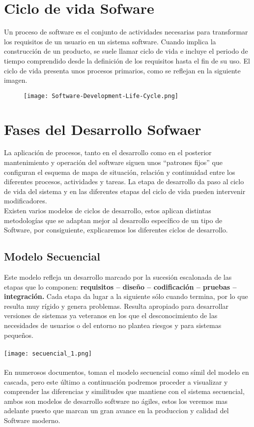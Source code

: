 \documentclass{article}
\begin{document}
\section{Ciclo de vida Sofware}
Un proceso de software es el conjunto de actividades necesarias para transformar los requisitos de un usuario en un sistema software. 
Cuando implica la construcción de un producto, se suele llamar ciclo de vida e incluye el periodo de tiempo comprendido desde la definición 
de los requisitos hasta el fin de su uso. El ciclo de vida presenta unos procesos primarios, como se reflejan en la siguiente imagen.
\\

\begin{figure}[b]
   
    \texttt{[image: Software-Development-Life-Cycle.png]}
    \centering
    
\end{figure}

\newpage
\section{Fases del Desarrollo Sofwaer}
La aplicación de procesos, tanto en el desarrollo como en el posterior mantenimiento y operación del software siguen unos “patrones fijos” 
que configuran el esquema de mapa de situación, relación y continuidad entre los diferentes procesos, actividades y tareas. La etapa de 
desarrollo da paso al ciclo de vida del sistema y en las diferentes etapas del ciclo de vida pueden intervenir modificadores.
\\
Existen varios modelos de ciclos de desarrollo, estos aplican distintas metodologías que se adaptan mejor al desarrollo específico de un tipo 
de Software, por consiguiente, explicaremos los diferentes ciclos de desarrollo.
\\
\subsection{Modelo Secuencial}
Este modelo refleja un desarrollo marcado por la sucesión escalonada de las etapas que lo componen: \textbf{requisitos – diseño – codificación – pruebas – integración.}
Cada etapa da lugar a la siguiente sólo cuando termina, por lo que resulta muy rígido y genera problemas. Resulta apropiado para desarrollar versiones de sistemas 
ya veteranos en los que el desconocimiento de las necesidades de usuarios o del entorno no plantea riesgos y para sistemas pequeños.
\\
\\
\texttt{[image: secuencial\_1.png]}
\\
\\
En numerosos documentos, toman el modelo secuencial como símil del modelo en cascada, pero este último a continuación podremos proceder a visualizar y comprender
las diferencias y similitudes que mantiene con el sistema secuencial, ambos son modelos de desarrollo software no ágiles, estos los veremos mas adelante puesto que 
marcan un gran avance en la produccion y calidad del Software moderno.
\end{document}

